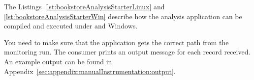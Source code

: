 
The Listings~\ref{lst:bookstoreAnalysisStarterLinux} and \ref{lst:bookstoreAnalysisStarterWin} %
describe how the analysis application can be compiled and executed under \UnixLikeSystems{} and Windows.

\setBashListing 		

	
	

\noindent You need to make sure that the application gets the correct path from the monitoring run. 
The consumer prints an output message for each record received. %
An example output can be found in Appendix~\ref{sec:appendix:manualInstrumentation:output}.
